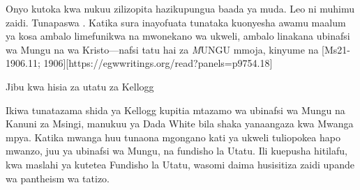 Onyo kutoka kwa nukuu zilizopita hazikupungua baada ya muda. Leo ni muhimu zaidi. Tunapaswa . Katika sura inayofuata tunataka kuonyesha awamu maalum ya kosa ambalo limefunikwa na mwonekano wa ukweli, ambalo linakana ubinafsi wa Mungu na wa Kristo—nafsi tatu hai za \textit MUNGU {mmoja}, kinyume na [Ms21-1906.11; 1906][https://egwwritings.org/read?panels=p9754.18]





Jibu kwa hisia za utatu za Kellogg

Ikiwa tunatazama shida ya Kellogg kupitia mtazamo wa ubinafsi wa Mungu na Kanuni za Msingi, manukuu ya Dada White bila shaka yanaangaza kwa Mwanga mpya. Katika mwanga huu tunaona mgongano kati ya ukweli tuliopokea hapo mwanzo, juu ya ubinafsi wa Mungu, na fundisho la Utatu. Ili kuepusha hitilafu, kwa maslahi ya kutetea Fundisho la Utatu, wasomi daima husisitiza zaidi upande wa pantheism wa tatizo.
